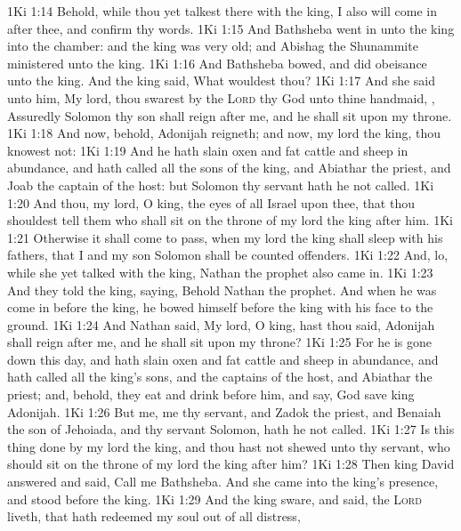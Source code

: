 \vs 1Ki 1:14 Behold, while thou yet talkest there with the king, I also will come in after thee, and confirm thy words.
\vs 1Ki 1:15 And Bathsheba went in unto the king into the chamber: and the king was very old; and Abishag the Shunammite ministered unto the king.
\vs 1Ki 1:16 And Bathsheba bowed, and did obeisance unto the king. And the king said, What wouldest thou?
\vs 1Ki 1:17 And she said unto him, My lord, thou swarest by the \textsc{Lord} thy God unto thine handmaid, , Assuredly Solomon thy son shall reign after me, and he shall sit upon my throne.
\vs 1Ki 1:18 And now, behold, Adonijah reigneth; and now, my lord the king, thou knowest  not:
\vs 1Ki 1:19 And he hath slain oxen and fat cattle and sheep in abundance, and hath called all the sons of the king, and Abiathar the priest, and Joab the captain of the host: but Solomon thy servant hath he not called.
\vs 1Ki 1:20 And thou, my lord, O king, the eyes of all Israel  upon thee, that thou shouldest tell them who shall sit on the throne of my lord the king after him.
\vs 1Ki 1:21 Otherwise it shall come to pass, when my lord the king shall sleep with his fathers, that I and my son Solomon shall be counted offenders.
\vs 1Ki 1:22 And, lo, while she yet talked with the king, Nathan the prophet also came in.
\vs 1Ki 1:23 And they told the king, saying, Behold Nathan the prophet. And when he was come in before the king, he bowed himself before the king with his face to the ground.
\vs 1Ki 1:24 And Nathan said, My lord, O king, hast thou said, Adonijah shall reign after me, and he shall sit upon my throne?
\vs 1Ki 1:25 For he is gone down this day, and hath slain oxen and fat cattle and sheep in abundance, and hath called all the king's sons, and the captains of the host, and Abiathar the priest; and, behold, they eat and drink before him, and say, God save king Adonijah.
\vs 1Ki 1:26 But me,  me thy servant, and Zadok the priest, and Benaiah the son of Jehoiada, and thy servant Solomon, hath he not called.
\vs 1Ki 1:27 Is this thing done by my lord the king, and thou hast not shewed  unto thy servant, who should sit on the throne of my lord the king after him?
\vs 1Ki 1:28 Then king David answered and said, Call me Bathsheba. And she came into the king's presence, and stood before the king.
\vs 1Ki 1:29 And the king sware, and said,  the \textsc{Lord} liveth, that hath redeemed my soul out of all distress,
